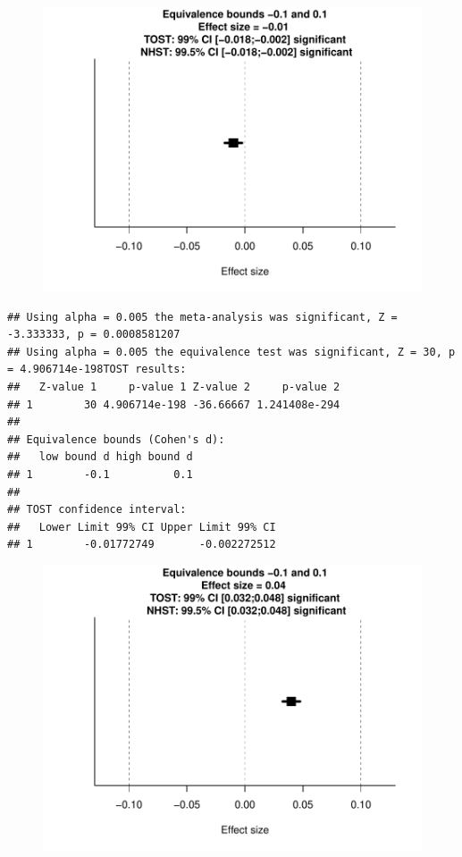 \documentclass[english,man]{apa6}
\theoremstyle{definition}
\theoremstyle{definition}
\theoremstyle{definition}
\theoremstyle{remark}
\begin{document}
\begin{figure}[htbp]
\centering
\includegraphics{manuscript_files/figure-latex/unnamed-chunk-7-5.pdf}
\caption{}
\end{figure}

\begin{verbatim}
## Using alpha = 0.005 the meta-analysis was significant, Z = -3.333333, p = 0.0008581207
## Using alpha = 0.005 the equivalence test was significant, Z = 30, p = 4.906714e-198TOST results:
##   Z-value 1     p-value 1 Z-value 2     p-value 2
## 1        30 4.906714e-198 -36.66667 1.241408e-294
## 
## Equivalence bounds (Cohen's d):
##   low bound d high bound d
## 1        -0.1          0.1
## 
## TOST confidence interval:
##   Lower Limit 99% CI Upper Limit 99% CI
## 1        -0.01772749       -0.002272512
\end{verbatim}

\begin{figure}[htbp]
\centering
\includegraphics{manuscript_files/figure-latex/unnamed-chunk-7-6.pdf}
\caption{}
\end{figure}
\end{document}
